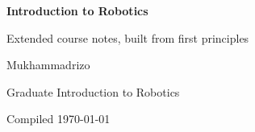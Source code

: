 \documentclass[10pt,a4paper,oneside]{book}
\begin{document}
\frontmatter
\begin{titlepage}
\centering
\vspace*{5cm}
{\Huge\bfseries Introduction to Robotics\par}
\vspace{6pt}
{\Large Extended course notes, built from first principles\par}
\vspace{1.5cm}
{\large Mukhammadrizo\par}
\vspace{4pt}
{\normalsize Graduate Introduction to Robotics\par}
\vfill
{\small Compiled \today}
\end{titlepage}

\tableofcontents


\mainmatter



\end{document}
